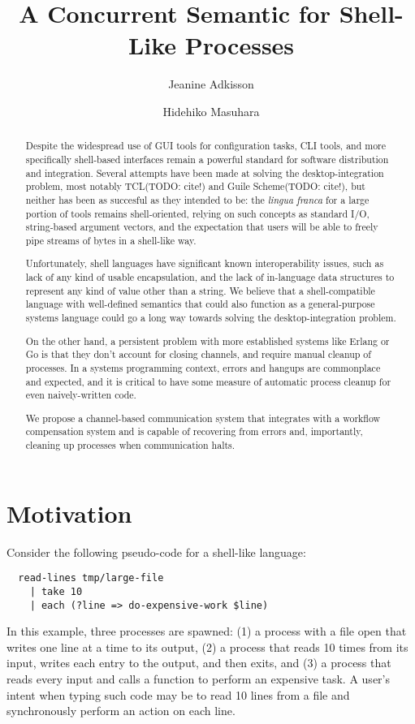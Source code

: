 \documentclass[format=sigconf, review=true, screen=true]{acmart}
\title{A Concurrent Semantic for Shell-Like Processes}
\author{Jeanine Adkisson}
\affiliation{Tokyo Institute of Technology}
\author{Hidehiko Masuhara}
\affiliation{Tokyo Institute of Technology}
\begin{document}
\begin{abstract}
Despite the widespread use of GUI tools for configuration tasks, CLI tools, and more specifically shell-based interfaces remain a powerful standard for software distribution and integration. Several attempts have been made at solving the desktop-integration problem, most notably TCL(TODO: cite!) and Guile Scheme(TODO: cite!), but neither has been as succesful as they intended to be: the \emph{lingua franca} for a large portion of tools remains shell-oriented, relying on such concepts as standard I/O, string-based argument vectors, and the expectation that users will be able to freely pipe streams of bytes in a shell-like way.

Unfortunately, shell languages have significant known interoperability issues, such as lack of any kind of usable encapsulation, and the lack of in-language data structures to represent any kind of value other than a string. We believe that a shell-compatible language with well-defined semantics that could also function as a general-purpose systems language could go a long way towards solving the desktop-integration problem.

On the other hand, a persistent problem with more established systems like Erlang or Go is that they don't account for closing channels, and require manual cleanup of processes. In a systems programming context, errors and hangups are commonplace and expected, and it is critical to have some measure of automatic process cleanup for even naively-written code.

We propose a channel-based communication system that integrates with a workflow compensation system and is capable of recovering from errors and, importantly, cleaning up processes when communication halts.
\end{abstract}
\maketitle

\section{Motivation}

Consider the following pseudo-code for a shell-like language:

\begin{verbatim}
  read-lines tmp/large-file
    | take 10
    | each (?line => do-expensive-work $line)
\end{verbatim}
In this example, three processes are spawned: (1) a process with a file open that writes one line at a time to its output, (2) a process that reads 10 times from its input, writes each entry to the output, and then exits, and (3) a process that reads every input and calls a function to perform an expensive task. A user's intent when typing such code may be to read 10 lines from a file and synchronously perform an action on each line.
\end{document}

